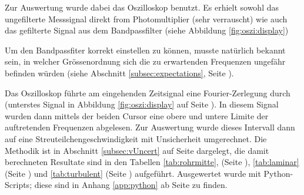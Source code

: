 Zur  Auswertung  wurde  dabei   das  Oszilloskop  benutzt. Es  erhielt  sowohl
das  ungefilterte Messsignal  direkt  from  Photomultiplier (sehr  verrauscht)
wie  auch  das  gefilterte  Signal aus  dem  Bandpassfilter  (siehe  Abbildung
\ref{fig:oszi:display})

Um  den  Bandpassfiter  korrekt  einstellen zu  k\"onnen,  musste  nat\"urlich
bekannt sein, in  welcher Gr\"ossenordnung sich die  zu erwartenden Frequenzen
ungef\"ahr befinden w\"urden (siehe Abschnitt \ref{subsec:expectations}, Seite
\pageref{subsec:expectations}).

Das  Oszilloskop f\"uhrte  am  eingehenden  Zeitsignal eine  Fourier-Zerlegung
durch  (unterstes   Signal  in  Abbildung  \ref{fig:oszi:display}   auf  Seite
\pageref{fig:oszi:display}   ).  In   diesem   Signal   wurden  dann   mittels
der   beiden  Cursor   eine   obere  und   untere   Limite  der   auftretenden
Frequenzen  abgelesen. Zur Auswertung  wurde  dieses Intervall  dann auf  eine
Streuteilchengeschwindigkeit   mit   Unsicherheit  umgerechnet. Die   Methodik
ist  in  Abschnitt  \ref{subsec:vUncert}  auf  Seite  \pageref{subsec:vUncert}
dargelegt,   die   damit   berechneten   Resultate  sind   in   den   Tabellen
\ref{tab:rohrmitte}, (Seite \pageref{tab:rohrmitte}), \ref{tab:laminar} (Seite
\pageref{tab:laminar}) und \ref{tab:turbulent} (Seite \pageref{tab:turbulent})
aufgef\"uhrt. Ausgewertet  wurde  mit  Python-Scripts; diese  sind  in  Anhang
\ref{app:python} ab Seite \pageref{app:python} zu finden.


\noindent{}

